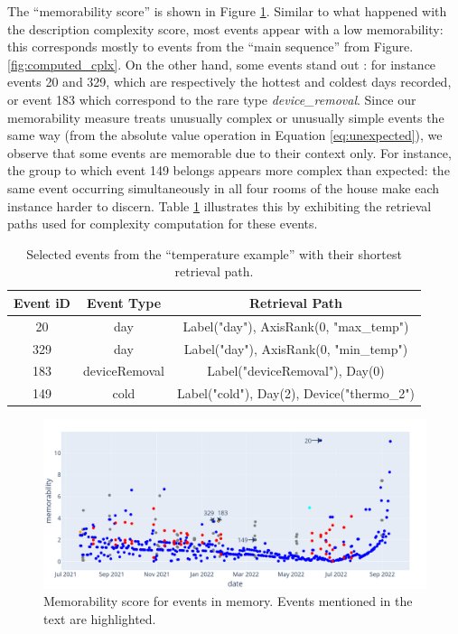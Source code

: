 \documentclass[entropy,article,submit,moreauthors,pdftex]{Definitions/mdpi}
\begin{document}
The ``memorability score'' is shown in Figure \ref{fig:result1}. Similar to what happened with the description complexity score, most events appear with a low memorability: this corresponds mostly to events from the ``main sequence'' from Figure. \ref{fig:computed_cplx}. On the other hand, some events stand out : for instance events 20 and 329, which are respectively the hottest and coldest days recorded, or event 183 which correspond to the rare type \emph{device\_removal}.
Since our memorability measure treats unusually complex or unusually simple events the
same way (from the absolute value operation in Equation \ref{eq:unexpected}), we
observe that some events are memorable due to their context only. For instance,
the group to which event 149 belongs appears more complex than expected: the same event occurring simultaneously in all four rooms of the house make each instance harder to discern.
Table \ref{tab:paths} illustrates this by exhibiting the retrieval paths used for complexity computation for these events.

\begin{table}
    \centering
    \begin{tabular}{c|c|c}
        Event iD & Event Type    & Retrieval Path                             \\
        \hline
        20       & day           & Label("day"), AxisRank(0, "max\_temp")     \\
        329      & day           & Label("day"), AxisRank(0, "min\_temp")     \\
        183      & deviceRemoval & Label("deviceRemoval"), Day(0)             \\
        149      & cold          & Label("cold"), Day(2), Device("thermo\_2") \\
    \end{tabular}
    \caption{Selected events from the ``temperature example'' with their shortest retrieval path.}
    \label{tab:paths}
\end{table}

\begin{figure}[!ht]
    \centering
    \includegraphics[width=.9\linewidth]{figures/memo_scenar_2.png}
    \caption{Memorability score for events in memory. Events mentioned in the text are highlighted.}
    \label{fig:result1}
\end{figure}
\end{document}
